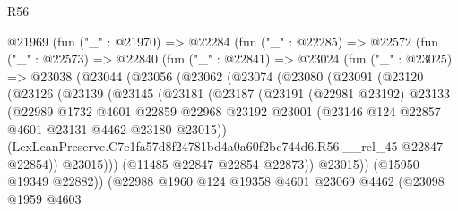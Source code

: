 \begin{lexlean}{R56}
\begin{coremodule}
        @21969
          (fun ("_" : @21970) =>
          @22284
            (fun ("_" : @22285) =>
            @22572
              (fun ("_" : @22573) =>
              @22840
                (fun ("_" : @22841) =>
                @23024
                  (fun ("_" : @23025) =>
                  @23038
                    (@23044
                      (@23056
                        (@23062
                          (@23074
                            (@23080
                              (@23091
                                (@23120
                                  (@23126
                                    (@23139
                                      (@23145
                                        (@23181
                                          (@23187
                                            (@23191
                                              (@22981 @23192)
                                              @23133
                                              (@22989
                                                @1732
                                                @4601
                                                @22859
                                                @22968
                                                @23192
                                                @23001
                                                (@23146
                                                  @124
                                                  @22857
                                                  @4601
                                                  @23131
                                                  @4462
                                                  @23180
                                                  @23015))
                                              (LexLeanPreserve.C7e1fa57d8f24781bd4a0a60f2bc744d6.R56.__rel_45
                                                @22847
                                                @22854))
                                            @23015)))
                                      (@11485 @22847 @22854 @22873))
                                    @23015))
                                (@15950 @19349 @22882))
                              (@22988
                                @1960
                                @124
                                @19358
                                @4601
                                @23069
                                @4462
                                (@23098
                                  @1959
                                  @4603

\end{coremodule}
\end{lexlean}
